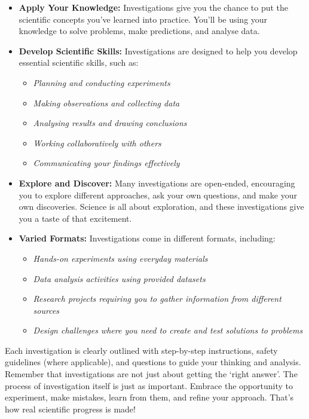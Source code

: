 \begin{itemize}
    \item \textbf{Apply Your Knowledge:} Investigations give you the chance to put the scientific concepts you’ve learned into practice.  You’ll be using your knowledge to solve problems, make predictions, and analyse data.
    \item \textbf{Develop Scientific Skills:}  Investigations are designed to help you develop essential scientific skills, such as:
        \begin{itemize}
            \item \textit{Planning and conducting experiments}
            \item \textit{Making observations and collecting data}
            \item \textit{Analysing results and drawing conclusions}
            \item \textit{Working collaboratively with others}
            \item \textit{Communicating your findings effectively}
        \end{itemize}
    \item \textbf{Explore and Discover:}  Many investigations are open-ended, encouraging you to explore different approaches, ask your own questions, and make your own discoveries.  Science is all about exploration, and these investigations give you a taste of that excitement.
    \item \textbf{Varied Formats:}  Investigations come in different formats, including:
        \begin{itemize}
            \item \textit{Hands-on experiments using everyday materials}
            \item \textit{Data analysis activities using provided datasets}
            \item \textit{Research projects requiring you to gather information from different sources}
            \item \textit{Design challenges where you need to create and test solutions to problems}
        \end{itemize}
\end{itemize}

Each investigation is clearly outlined with step-by-step instructions, safety guidelines (where applicable), and questions to guide your thinking and analysis.  Remember that investigations are not just about getting the ‘right answer’.  The process of investigation itself is just as important.  Embrace the opportunity to experiment, make mistakes, learn from them, and refine your approach.  That’s how real scientific progress is made!


